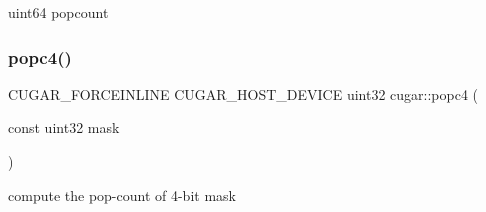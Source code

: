 uint64 popcount \mbox{\label{group___bits_module_ga4bc7fb7acba5b770553c58bfae69f5af}} 
\subsubsection{\texorpdfstring{popc4()}{popc4()}}
{\footnotesize\ttfamily C\+U\+G\+A\+R\+\_\+\+F\+O\+R\+C\+E\+I\+N\+L\+I\+NE C\+U\+G\+A\+R\+\_\+\+H\+O\+S\+T\+\_\+\+D\+E\+V\+I\+CE uint32 cugar\+::popc4 (\begin{DoxyParamCaption}\item[{const uint32}]{mask }\end{DoxyParamCaption})}

compute the pop-\/count of 4-\/bit mask 